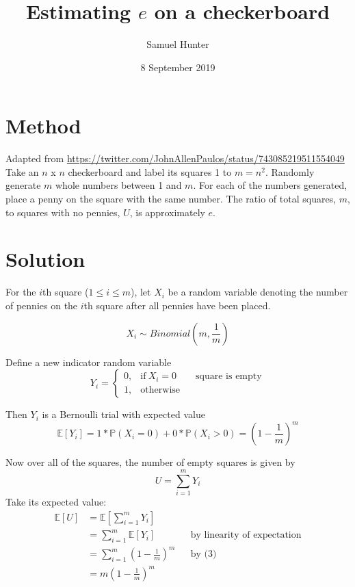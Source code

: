 \documentclass[a4paper,12pt]{article}
\begin{document}
\title{Estimating $e$ on a checkerboard}
\author{Samuel Hunter}
\date{8 September 2019}
\maketitle

\section*{Method}
Adapted from \url{https://twitter.com/JohnAllenPaulos/status/743085219511554049}
Take an $n$ x $n$ checkerboard and label its squares 1 to $m=n^2$. Randomly generate $m$ whole numbers between 1 and $m$. For each of the numbers generated, place a penny on the square with the same number. The ratio of total squares, $m$, to squares with no pennies, $U$, is approximately $e$.

\section*{Solution}
For the $i$th square ($1 \leq i \leq m$), let $X_i$ be a random variable denoting the number of pennies on the $i$th square after all pennies have been placed.

\begin{equation}
	X_i \sim Binomial(m, \frac{1}{m})
\end{equation}

\noindent Define a new indicator random variable
\begin{equation}
	Y_i=
	\begin{cases}
		0, & \text{if}\ X_i=0 \qquad \text{square is empty} \\
		1, & \text{otherwise}
	\end{cases}
\end{equation}

Then $Y_i$ is a Bernoulli trial with expected value
\begin{equation}
	\mathbb{E}[Y_i] = 1*\mathbb{P}(X_i=0) + 0*\mathbb{P}(X_i>0) = (1-\frac{1}{m})^m
\end{equation}

\noindent Now over all of the squares, the number of empty squares is given by
\begin{equation}
	U = \sum_{i=1}^{m}{Y_i}
\end{equation}
\indent Take its expected value:
\begin{align}
	\mathbb{E}[U] &= \mathbb{E}[\sum_{i=1}^{m}{Y_i}]\nonumber\\
	&=\sum_{i=1}^{m}{\mathbb{E}[Y_i]} &&\text{by linearity of expectation}\nonumber\\
	&=\sum_{i=1}^{m}{(1-\frac{1}{m})^m} &&\text{by (3)}\nonumber\\
	&=m(1-\frac{1}{m})^m
\end{align}
\end{document}
